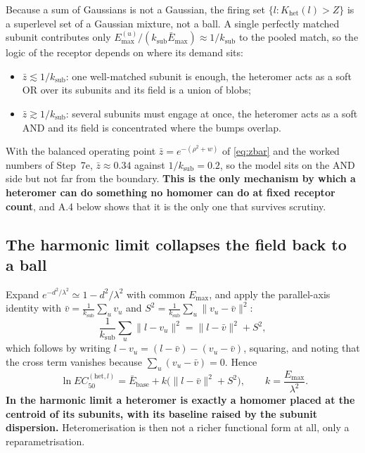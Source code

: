 \documentclass[11pt,a4paper]{article}
\newcommand{\ksub}{k_{\mathrm{sub}}}
\newcommand{\Emax}{E_{\mathrm{max}}}
\begin{document}
Because a sum of Gaussians is not a Gaussian, the firing set
$\{l : K_{\mathrm{het}}(l)>Z\}$ is a superlevel set of a Gaussian mixture, not a ball.
A single perfectly matched subunit contributes only $\Emax^{(u)}/(\ksub\bar{E}_{\max})
\approx 1/\ksub$ to the pooled match, so the logic of the receptor depends on where its
demand sits:
\begin{itemize}
  \item $\bar z\lesssim1/\ksub$: one well-matched subunit is enough, the heteromer acts
    as a soft OR over its subunits and its field is a union of blobs;
  \item $\bar z\gtrsim1/\ksub$: several subunits must engage at once, the heteromer acts
    as a soft AND and its field is concentrated where the bumps overlap.
\end{itemize}
With the balanced operating point $\bar z=e^{-(\rho^2+w)}$ of \eqref{eq:zbar} and the
worked numbers of Step~7e, $\bar z\approx0.34$ against $1/\ksub=0.2$, so the model sits
on the AND side but not far from the boundary. \textbf{This is the only mechanism by
which a heteromer can do something no homomer can do at fixed receptor count}, and
A.4 below shows that it is the only one that survives scrutiny.

\subsection{The harmonic limit collapses the field back to a ball}

Expand $e^{-d^2/\lambda^2}\simeq1-d^2/\lambda^2$ with common $\Emax$, and apply the
parallel-axis identity with $\bar v=\frac{1}{\ksub}\sum_u v_u$ and
$S^2=\frac{1}{\ksub}\sum_u\|v_u-\bar v\|^2$:
\begin{equation}
  \frac{1}{\ksub}\sum_u\|l-v_u\|^2=\|l-\bar v\|^2+S^2 ,
\end{equation}
which follows by writing $l-v_u=(l-\bar v)-(v_u-\bar v)$, squaring, and noting that the
cross term vanishes because $\sum_u(v_u-\bar v)=0$. Hence
\begin{equation}
  \boxed{\;\ln EC_{50}^{(\mathrm{het},l)}
   = \bar{E}_{\mathrm{base}} + k\big(\|l-\bar v\|^2+S^2\big),
   \qquad k=\frac{\Emax}{\lambda^2}. }
  \label{eq:hetharm}
\end{equation}
\textbf{In the harmonic limit a heteromer is exactly a homomer placed at the centroid of
its subunits, with its baseline raised by the subunit dispersion.} Heteromerisation is
then not a richer functional form at all, only a reparametrisation.
\end{document}
